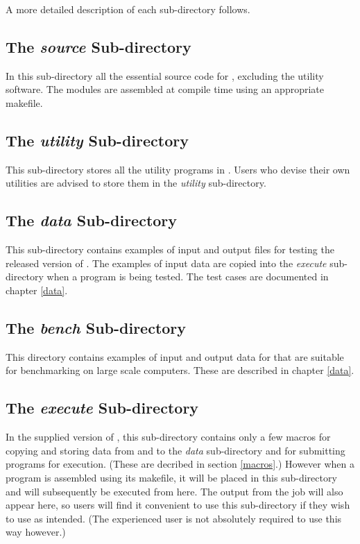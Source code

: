 A more detailed description of each sub-directory follows.

\subsection{The {\em source} Sub-directory}

In this sub-directory all the essential source code for \D{}, excluding the
utility software. The modules are assembled at compile time using an
appropriate makefile.

\subsection{The {\em utility} Sub-directory}

This sub-directory stores all the utility programs in \D{}.  Users who devise
their own utilities are advised to store them in the {\em utility}
sub-directory.

\subsection{The {\em data} Sub-directory}

This sub-directory contains examples of input and output files for
testing the released version of \D{}. The examples of input data
are copied into the {\em execute} sub-directory when a program is being
tested. The test cases are documented in chapter \ref{data}.

\subsection{The {\em bench} Sub-directory}

This directory contains examples of input and output data for \D{} that
are suitable for benchmarking \D{} on large scale computers. These are
described in chapter \ref{data}.

\subsection{The {\em execute} Sub-directory}

In the supplied version of \D{}, this sub-directory contains only
a few macros for copying and storing data from and to the {\em data}
sub-directory and for submitting programs for execution. (These are
decribed in section \ref{macros}.) However when
a \D{} program is assembled using its makefile, it will be placed
in this sub-directory and will subsequently be executed from here. The
output from the job will also appear here, so users will find it
convenient to use this sub-directory if they wish to use \D{} as
intended. (The experienced user is not absolutely required to use
\D{} this way however.)


